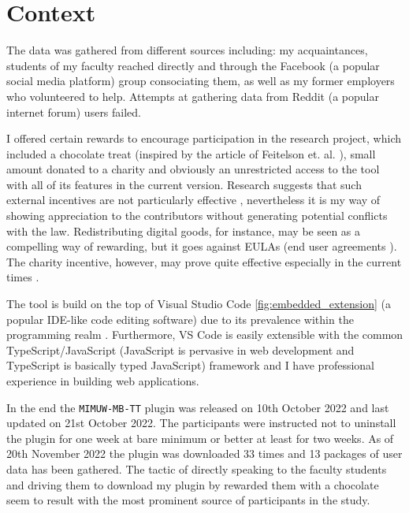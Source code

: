 \section{Context}


The data was gathered from different sources including: my acquaintances, students of my faculty reached directly and through the Facebook (a popular social media platform) group consociating them, as well as my former employers who volunteered to help. Attempts at gathering data from Reddit (a popular internet forum) users failed.

I offered certain rewards to encourage participation in the research project, which included a chocolate treat (inspired by the article of Feitelson et. al. \cite{Fei22DeveloperNames}), small amount donated to a charity and obviously an unrestricted access to the tool with all of its features in the current version. Research suggests that such external incentives are not particularly effective \cite{Coh19AltruisticSurvey, Bru11DifferentMotivations}, nevertheless it is my way of showing appreciation to the contributors without generating potential conflicts with the law. Redistributing digital goods, for instance, may be seen as a compelling way of rewarding, but it goes against EULAs (end user agreements \cite{EULA}). The charity incentive, however, may prove quite effective especially in the current times \cite{Forbes22Philanthropy}.

The tool is build on the top of Visual Studio Code \ref{fig:embedded_extension} (a popular IDE-like code editing software) due to its prevalence within the programming realm \cite{StackOverflow22Survey}. Furthermore, VS Code is easily extensible with the common TypeScript/JavaScript (JavaScript is pervasive in web development and TypeScript is basically typed JavaScript) framework and I have professional experience in building web applications.

In the end the \texttt{MIMUW-MB-TT} plugin was released on 10th October 2022 and last updated on 21st October 2022. The participants were instructed not to uninstall the plugin for one week at bare minimum or better at least for two weeks. As of 20th November 2022 the plugin was downloaded 33 times and 13 packages of user data has been gathered. The tactic of directly speaking to the faculty students and driving them to download my plugin by rewarded them with a chocolate seem to result with the most prominent source of participants in the study.

